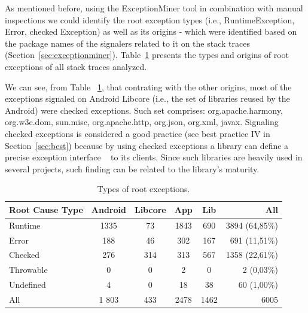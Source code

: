 \documentclass[conference]{IEEEtran}
\begin{document}
As mentioned before, using the ExceptionMiner tool in combination with manual inspections we could identify
the root exception types (i.e., RuntimeException, Error, checked Exception) as well as its origins - which were 
identified based on the package names of the signalers related to it on the stack traces (Section~\ref{sec:exceptionminer}).
Table~\ref{tab:typeroottab} presents the types and origins of root exceptions of all stack traces analyzed. 

We can see, from Table ~\ref{tab:typeroottab}, that contrating with the other origins, most of the 
 exceptions signaled on Android Libcore (i.e., the set of libraries reused by the Android) were 
checked exceptions. Such set comprises: org.apache.harmony, org.w3c.dom, sun.misc, 
org.apache.http, org.json, org.xml, javax. Signaling checked exceptions is considered a 
good practice (see best practice IV in Section~\ref{sec:best}) because by using checked exceptions a library can define a precise 
exception interface ~\cite{miller1997issues} to its clients.
 Since such libraries are heavily used  in several projects, such finding can be related to the library's maturity.


\begin{table}
\centering
\begin{tabular}{lccccr}
    \hline
    \bfseries{Root Cause Type} & \bfseries{Android} & \bfseries{Libcore} & \bfseries{App} & \bfseries{Lib}  & \bfseries{All}\\
    \hline

Runtime	&	1335	&	73	&	1843	&	690  &	3894 (64,85\%)\\  %
Error	       &	 188              &	 46	&	302             &	167	           &	691 (11,51\%)	\\
Checked	&	276           &	314	&	313          &	567	           &	1358 (22,61\%)	\\
Throwable	&	0	       &	0	&	2            &	0         &	2 (0,03\%)	\\
Undefined	&	4	&	0	&	18		&	38	   &	60	(1,00\%) \\
 \hline
All		& 1  803	&	433	&	2478	&	1462	&	6005	\\
    \hline
  \end{tabular}
\caption{Types of root exceptions.}
  \label{tab:typeroottab}
\end{table}
\end{document}

